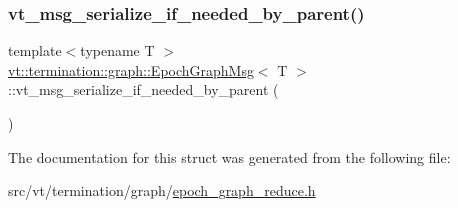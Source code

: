 \mbox{\label{structvt_1_1termination_1_1graph_1_1_epoch_graph_msg_a88e8c54930cda6396ffcec2d1223b97f}} 
\subsubsection{\texorpdfstring{vt\+\_\+msg\+\_\+serialize\+\_\+if\+\_\+needed\+\_\+by\+\_\+parent()}{vt\_msg\_serialize\_if\_needed\_by\_parent()}}
{\footnotesize\ttfamily template$<$typename T $>$ \\
\hyperlink{structvt_1_1termination_1_1graph_1_1_epoch_graph_msg}{vt\+::termination\+::graph\+::\+Epoch\+Graph\+Msg}$<$ T $>$\+::vt\+\_\+msg\+\_\+serialize\+\_\+if\+\_\+needed\+\_\+by\+\_\+parent (\begin{DoxyParamCaption}{ }\end{DoxyParamCaption})}



The documentation for this struct was generated from the following file\+:\begin{DoxyCompactItemize}
\item 
src/vt/termination/graph/\hyperlink{epoch__graph__reduce_8h}{epoch\+\_\+graph\+\_\+reduce.\+h}\end{DoxyCompactItemize}
